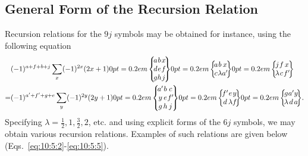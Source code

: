 \subsection{General Form of the Recursion Relation}\label{sec:10.5.1}
Recursion relations for the $9 j$ symbols may be obtained for instance, using the following equation \cite{ref077}
\begin{align}
& (-1)^{a+f+b+j} \sum_{x}(-1)^{2 x}(2 x+1)\ninej{a}{b}{x}{d}{e}{f}{g}{h}{j}\sixj{a}{b}{x}{c}{\lambda}{a^{\prime}}\sixj{j}{f}{x}{\lambda}{c}{f^{\prime}}  \notag\\
= & (-1)^{a^{\prime}+f^{\prime}+g+e} \sum_{y}(-1)^{2 y}(2 y+1)\ninej{a^{\prime}}{b}{c}{y}{e}{f^{\prime}}{g}{h}{j}\sixj{f^{\prime}}{e}{y}{d}{\lambda}{f}\sixj{g}{a^{\prime}}{y}{\lambda}{d}{a} . \label{eq:10:5:1}
\end{align}
Specifying $\lambda=\frac{1}{2}, 1, \frac{3}{2}, 2$, etc. and using explicit forms of the $6 j$ symbols, we may obtain various recursion relations. Examples of such relations are given below (Eqs.~\eqref{eq:10:5:2}-\eqref{eq:10:5:5}).

